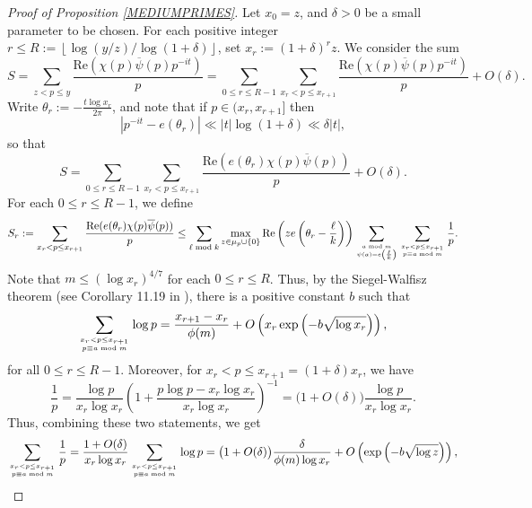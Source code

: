\documentclass[12pt]{amsart}
\theoremstyle{definition}
\numberwithin{equation}{section}
\renewcommand{\bar}{\overline}
\begin{document}
\begin{proof}[Proof of Proposition \ref{MEDIUMPRIMES}]
Let $x_0=z$, and $\delta>0$ be a small parameter to be chosen. For each positive integer $r \leq R := \left\lfloor\log(y/z)/\log(1+\delta)\right\rfloor$, set $x_r := (1+\delta)^r z$. We consider the sum
$$  S= \sum_{z < p \leq y}\frac{\text{Re}(\chi(p)\bar{\psi}(p)p^{-it})}{p}=\sum_{0 \leq r \leq R-1} \sum_{x_r < p \leq x_{r+1}} \frac{\text{Re}(\chi(p)\bar{\psi}(p)p^{-it})}{p} + O\left(\delta\right).
$$
Write $\theta_r := -\frac{t \log x_r}{2\pi}$, and note that if $p \in (x_r,x_{r+1}]$ then $$|p^{-it} - e(\theta_r)| \ll |t| \log(1+\delta) \ll \delta|t|,$$ so that
\begin{equation}\label{SPLIT}
S= \sum_{0 \leq r \leq R-1} \sum_{x_r < p \leq x_{r+1}} \frac{\text{Re}(e(\theta_r)\chi(p)\bar{\psi}(p))}{p}
 +O\left(\delta\right).
\end{equation}
For each $0 \leq r \leq R-1$, we define
$$
S_r:=\sum_{x_r < p \leq x_{r+1}} \frac{\text{Re}(e(\theta_r)\chi(p)\bar{\psi}(p))}{p}
\leq  \sum_{\ell \bmod k} \max_{z \in \mu_p \cup \{0\}} \text{Re}\left(ze\left(\theta_r-\frac{\ell}{k}\right)\right)\sum_{a \bmod m \atop \psi(a) = e\left(\frac{\ell}{k}\right)} \sum_{x_r < p \leq x_{r+1} \atop p \equiv a \bmod m} \frac{1}{p}.
$$
Note that $m  \leq (\log x_r)^{4/7}$ for each $0 \leq r \leq R$.  Thus, by the Siegel-Walfisz theorem (see Corollary 11.19 in \cite{MVbook}), there is a positive constant $b$ such that 
\begin{equation*}
\sum_{x_r < p \leq x_{r+1} \atop p \equiv a \bmod m} \log p = \frac{x_{r+1}-x_r}{\phi(m)} +O\left(x_r \exp\left(-b\sqrt{\log x_r}\right)\right),
\end{equation*}
for all $0 \leq r \leq R-1$. Moreover, for $x_r < p \leq x_{r+1} = (1+\delta)x_r$, we have
$$
\frac{1}{p} = \frac{\log p}{x_r\log x_r}\left(1+\frac{p\log p-x_r\log x_r}{x_r\log x_r}\right)^{-1}= \big(1+O(\delta)\big) \frac{\log p}{x_r\log x_r}.
$$
Thus, combining these two statements, we get
\begin{equation*}
\sum_{x_r < p \leq x_{r+1} \atop p \equiv a \bmod m} \frac{1}{p} = \frac{1+O(\delta)}{x_r\log x_r} \sum_{x_r < p \leq x_{r+1} \atop p \equiv a \bmod m} \log p = \big(1+O(\delta)\big)\frac{\delta}{\phi(m) \log x_r} +O\left(\exp\left(-b\sqrt{\log z}\right)\right),

\end{equation*}
\end{proof}
\end{document}
